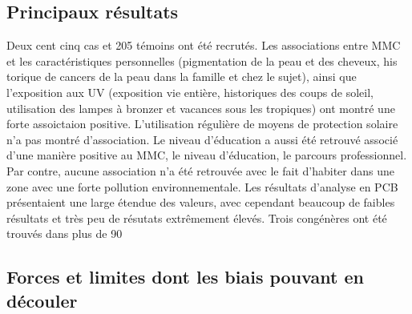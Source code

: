 \documentclass[10pt]{article}
\begin{document}
\subsection{Principaux résultats}
Deux cent cinq cas et 205 témoins ont été recrutés. Les associations entre MMC et les caractéristiques personnelles (pigmentation de la peau et des cheveux, his torique de cancers de la peau dans la famille et chez le sujet), ainsi que l'exposition aux UV (exposition vie entière, historiques des coups de soleil, utilisation des lampes à bronzer et vacances sous les tropiques) ont montré une forte assoictaion positive. L'utilisation régulière de moyens de protection solaire n'a pas montré d'association. Le niveau d'éducation a aussi été retrouvé associé d'une manière positive au MMC, le niveau d'éducation, le parcours professionnel. Par contre, aucune association n'a été retrouvée avec le fait d'habiter dans une zone avec une forte pollution environnementale.
Les résultats d'analyse en PCB présentaient une large étendue des valeurs, avec cependant beaucoup de faibles résultats et très peu de résutats extrêmement élevés. Trois congénères ont été trouvés dans plus de 90~%

\subsection{Forces et limites dont les biais pouvant en découler}
\end{document}
